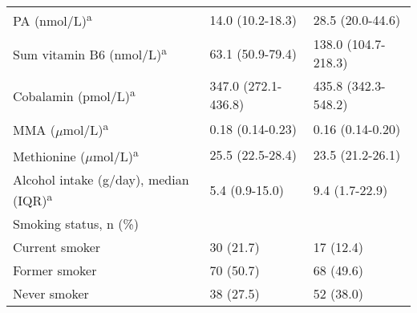 \begin{center}
\begin{table}
\begin{adjustbox}{width=\textwidth}
\begin{tabular}{L{7.6cm}C{4.0cm}C{3.6cm}}
\quad PA (nmol/L)\textsuperscript{a} & 14.0 (10.2-18.3) & 28.5 (20.0-44.6)\\
\quad Sum vitamin B6 (nmol/L)\textsuperscript{a} & 63.1 (50.9-79.4) & 138.0 (104.7-218.3)\\
\quad Cobalamin (pmol/L)\textsuperscript{a} & 347.0 (272.1-436.8) & 435.8 (342.3-548.2)\\
\quad MMA ($\mu$mol/L)\textsuperscript{a} & 0.18 (0.14-0.23) & 0.16 (0.14-0.20)\\
\quad Methionine ($\mu$mol/L)\textsuperscript{a} & 25.5 (22.5-28.4) & 23.5 (21.2-26.1)\\
Alcohol intake (g/day), median (IQR)\textsuperscript{a} & 5.4 (0.9-15.0) & 9.4 (1.7-22.9)\\
Smoking status, n (\%) &~ &~\\
\quad Current smoker & 30 (21.7) & 17 (12.4)\\
\quad Former smoker & 70 (50.7) & 68 (49.6)\\
\quad Never smoker & 38 (27.5) & 52 (38.0)\\
\end{tabular}
\end{adjustbox}
\end{table}
\end{center}


